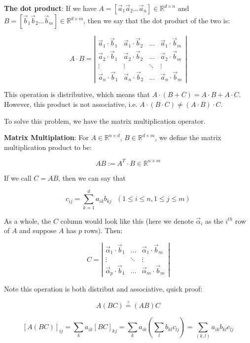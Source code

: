\documentclass[11 pt, twoside]{article}
\begin{document}
\textbf{The dot product}: If we have $A = [\vec{a}_1 \vec{a}_2 \dots \vec{a}_n]
\in \mathbb{R}^{d \times n}$ and $B = [\vec{b}_1 \vec{b}_2 \dots \vec{b}_m]
\in \mathbb{R}^{d \times m}$, then we say that the dot product of the two is:

\[
A \cdot B = \left|\begin{array}{cccc}
\vec{a}_1 \cdot \vec{b}_1 & \vec{a}_1 \cdot \vec{b}_2 & \dots &
\vec{a}_1 \cdot \vec{b}_m \\
\vec{a}_2 \cdot \vec{b}_1 & \vec{a}_2 \cdot \vec{b}_2 & \dots &
\vec{a}_2 \cdot \vec{b}_m \\
\vdots & \vdots & \ddots & \vdots\\
\vec{a}_n \cdot \vec{b}_1 & \vec{a}_n \cdot \vec{b}_2 & \dots &
\vec{a}_n \cdot \vec{b}_m
\end{array}\right|
\]

This operation is distributive, which means that $A \cdot (B + C) = A \cdot B +
A \cdot C$. However, this product is not associative, i.e. $A \cdot (B \cdot C)
\neq (A \cdot B) \cdot C$.

To solve this problem, we have the matrix multiplication operator.

\textbf{Matrix Multiplation}: For $A \in \mathbb{R}^{n\times d}$, $B \in
\mathbb{R}^{d\times m}$, we define the matrix multiplication product to be:

$$\boxed{AB := A^T \cdot B} \in \mathbb{R}^{n\times m}$$

If we call $C = AB$, then we can say that

$$c_{ij} = \sum_{k = 1}^d a_{ik} b_{kj} \text{  } (1 \leq i \leq n, 1 \leq j
\leq m)$$

As a whole, the $C$ column would look like this (here we denote $\vec{\alpha}_i$
as the $i^{th}$ row of $A$ and suppose $A$ has $p$ rows). Then:

\[
C = \left|\begin{array}{ccc}
\vec{\alpha}_1 \cdot \vec{b}_1 & \dots & \vec{\alpha}_1 \cdot
\vec{b}_m\\
\vdots & \ddots & \vdots\\
\vec{\alpha}_p \cdot \vec{b}_1 & \dots & \vec{\alpha}_m \cdot
\vec{b}_m
\end{array}\right|
\]

Note this operation is both distribut and associative, quick proof:

$$A (BC) \overset{?}{=} (AB) C$$

$$[A(BC)]_{ij} = \sum_{k} a_{ik} [BC]_{kj} = \sum_k a_{ik} (\sum_l b_{kl} c_{lj})
= \sum_{(k, l)} a_{ik} b_{kl} c_{lj}$$
\end{document}
